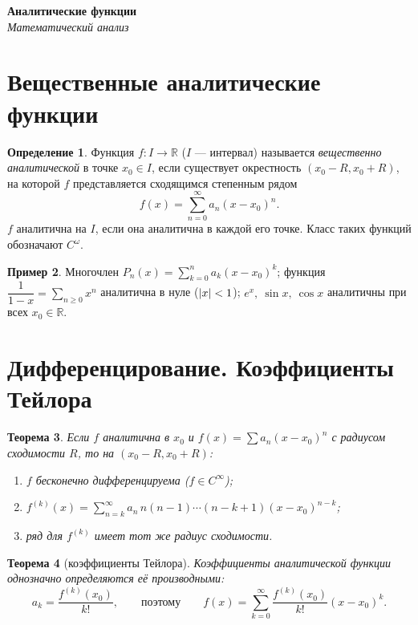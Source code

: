 \documentclass[11pt,a4paper]{article}
\newcommand{\coursename}{Математический анализ}
\newcommand{\doctitle}{Аналитические функции}
\theoremstyle{definition}
\newtheorem{definition}{Определение}[section]
\newtheorem{example}[definition]{Пример}
\theoremstyle{plain}
\newtheorem{theorem}[definition]{Теорема}
\newcommand{\R}{\mathbb{R}}
\renewcommand{\ge}{\geqslant}
\DeclarePairedDelimiter{\abs}{\lvert}{\rvert}
\begin{document}
\begin{center}
  {\LARGE\bfseries \doctitle}\\[4pt]
  {\large\itshape \coursename}
\end{center}
\vspace{6pt}

\section{Вещественные аналитические функции}

\begin{definition}
Функция $f\colon I\to\R$ ($I$ — интервал) называется \emph{вещественно аналитической} в точке
$x_0\in I$, если существует окрестность $(x_0-R,x_0+R)$, на которой $f$ представляется сходящимся
степенным рядом
\[
  f(x)=\sum_{n=0}^\infty a_n(x-x_0)^n .
\]
$f$ аналитична на $I$, если она аналитична в каждой его точке. Класс таких функций обозначают
$C^{\omega}$.
\end{definition}

\begin{example}
Многочлен $P_n(x)=\sum_{k=0}^n a_k(x-x_0)^k$; функция $\dfrac1{1-x}=\sum_{n\ge0}x^n$ аналитична в
нуле ($\abs x<1$); $e^x,\ \sin x,\ \cos x$ аналитичны при всех $x_0\in\R$.
\end{example}

\section{Дифференцирование. Коэффициенты Тейлора}

\begin{theorem}
Если $f$ аналитична в $x_0$ и $f(x)=\sum a_n(x-x_0)^n$ с радиусом сходимости $R$, то на
$(x_0-R,x_0+R)$:
\begin{enumerate}[label=\arabic*),leftmargin=*]
  \item $f$ бесконечно дифференцируема ($f\in C^\infty$);
  \item $\displaystyle f^{(k)}(x)=\sum_{n=k}^\infty a_n\,n(n-1)\cdots(n-k+1)(x-x_0)^{n-k}$;
  \item ряд для $f^{(k)}$ имеет тот же радиус сходимости.
\end{enumerate}
\end{theorem}

\begin{theorem}[коэффициенты Тейлора]
Коэффициенты аналитической функции однозначно определяются её производными:
\[
  a_k=\frac{f^{(k)}(x_0)}{k!},\qquad\text{поэтому}\qquad
  f(x)=\sum_{k=0}^\infty\frac{f^{(k)}(x_0)}{k!}(x-x_0)^k .
\]
\end{theorem}
\end{document}
